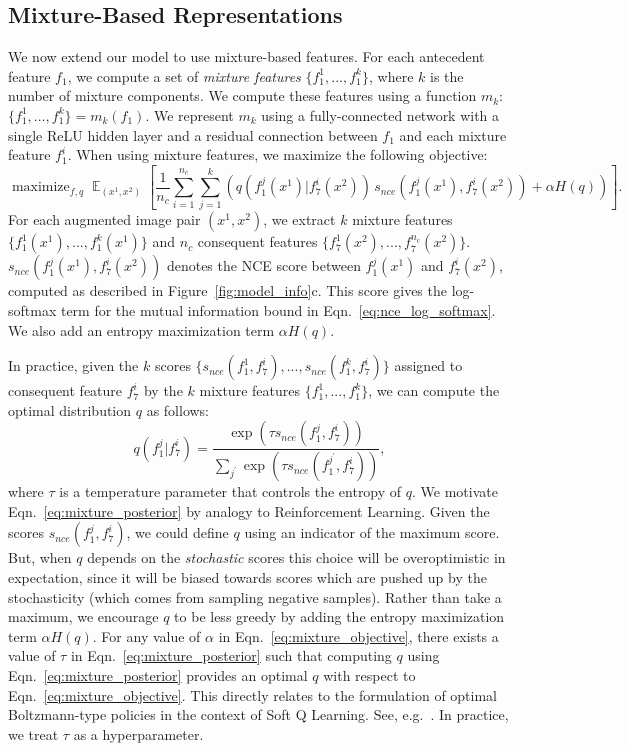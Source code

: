 \documentclass{article}
\DeclareMathOperator*{\expect}{\mathbb{E}}
\DeclareMathOperator*{\maximize}{maximize}
\begin{document}
\subsection{Mixture-Based Representations}
\label{sec:mixtures}
We now extend our model to use mixture-based features.
For each antecedent feature $f_1$, we compute a set of \emph{mixture features} $\{f_1^1, ..., f_1^k\}$, where $k$ is the number of mixture components. We compute these features using a function $m_k$: $\{f_1^1,...,f_1^k\} = m_k(f_1)$.
We represent $m_k$ using a fully-connected network with a single ReLU hidden layer and a residual connection between $f_1$ and each mixture feature $f_1^i$.
When using mixture features, we maximize the following objective:
\begin{equation}
 \maximize_{f, q} \expect_{(x^1, x^2)} \left[ \frac{1}{n_c} \sum_{i=1}^{n_c} \sum_{j=1}^{k} \left( q(f_1^j(x^1) | f_7^i(x^2)) \, s_{nce}(f_1^j(x^1), f_7^i(x^2)) + \alpha H(q) \right) \right].
 \label{eq:mixture_objective}
\end{equation}
For each augmented image pair $(x^1, x^2)$, we extract $k$ mixture features $\{f_1^1(x^1),...,f_1^k(x^1)\}$ and $n_c$ consequent features $\{f_7^1(x^2),...,f_7^{n_c}(x^2)\}$. $s_{nce}(f_1^j(x^1), f_7^i(x^2))$ denotes the NCE score between $f_1^j(x^1)$ and $f_7^i(x^2)$, computed as described in Figure~\ref{fig:model_info}c. This score gives the log-softmax term for the mutual information bound in Eqn.~\ref{eq:nce_log_softmax}. We also add an entropy maximization term $\alpha H(q)$.

In practice, given the $k$ scores $\{s_{nce}(f_1^1, f_7^i),...,s_{nce}(f_1^k, f_7^i)\}$ assigned to consequent feature $f_7^i$ by the $k$ mixture features $\{f_1^1,...,f_1^k\}$, we can compute the optimal distribution $q$ as follows:
\begin{equation}
q(f_1^j | f_7^i) = \frac{ \exp(\tau s_{nce}(f_1^j, f_7^i)) }{ \sum_{j^{\prime}} \exp(\tau s_{nce}(f_1^{j^{\prime}}, f_7^i)) },
\label{eq:mixture_posterior}
\end{equation}
where $\tau$ is a temperature parameter that controls the entropy of $q$. We motivate Eqn.~\ref{eq:mixture_posterior} by analogy to Reinforcement Learning. Given the scores $s_{nce}(f_1^j, f_7^i)$, we could define $q$ using an indicator of the maximum score. But, when $q$ depends on the \emph{stochastic} scores this choice will be overoptimistic in expectation, since it will be biased towards scores which are pushed up by the stochasticity (which comes from sampling negative samples).
Rather than take a maximum, we encourage $q$ to be less greedy by adding the entropy maximization term $\alpha H(q)$. For any value of $\alpha$ in Eqn.~\ref{eq:mixture_objective}, there exists a value of $\tau$ in Eqn.~\ref{eq:mixture_posterior} such that computing $q$ using Eqn.~\ref{eq:mixture_posterior} provides an optimal $q$ with respect to Eqn.~\ref{eq:mixture_objective}. This directly relates to the formulation of optimal Boltzmann-type policies in the context of Soft Q Learning. See, e.g.~\cite{Haarnoja2017}. In practice, we treat $\tau$ as a hyperparameter. 
\end{document}
